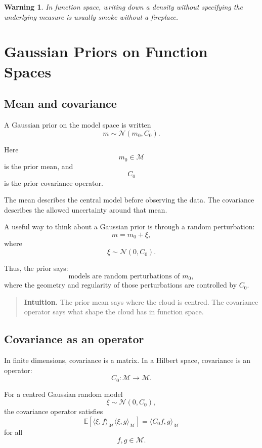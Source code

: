 \documentclass[11pt,a4paper]{book}
\newtheorem{warning}[definition]{Warning}
\newenvironment{intuition}
  {\begin{quote}\textbf{Intuition.}}
  {\end{quote}}
\newcommand{\M}{\mathcal{M}}      %
\begin{document}
\begin{warning}
In function space, writing down a density without specifying the underlying
measure is usually smoke without a fireplace.
\end{warning}


\chapter{Gaussian Priors on Function Spaces}

\section{Mean and covariance}

A Gaussian prior on the model space is written
\[
    m \sim \mathcal{N}(m_0,C_0).
\]

Here
\[
    m_0\in\M
\]
is the prior mean, and
\[
    C_0
\]
is the prior covariance operator.

The mean describes the central model before observing the data. The covariance
describes the allowed uncertainty around that mean.

A useful way to think about a Gaussian prior is through a random perturbation:
\[
    m = m_0+\xi,
\]
where
\[
    \xi \sim \mathcal{N}(0,C_0).
\]

Thus, the prior says:
\[
    \text{models are random perturbations of } m_0,
\]
where the geometry and regularity of those perturbations are controlled by
$C_0$.

\begin{intuition}
The prior mean says where the cloud is centred.
The covariance operator says what shape the cloud has in function space.
\end{intuition}

\section{Covariance as an operator}

In finite dimensions, covariance is a matrix. In a Hilbert space, covariance is
an operator:
\[
    C_0 : \M \to \M.
\]

For a centred Gaussian random model
\[
    \xi \sim \mathcal{N}(0,C_0),
\]
the covariance operator satisfies
\[
    \mathbb{E}
    \left[
        \langle \xi,f\rangle_{\M}
        \langle \xi,g\rangle_{\M}
    \right]
    =
    \langle C_0 f,g\rangle_{\M}
\]
for all
\[
    f,g\in\M.
\]
\end{document}
